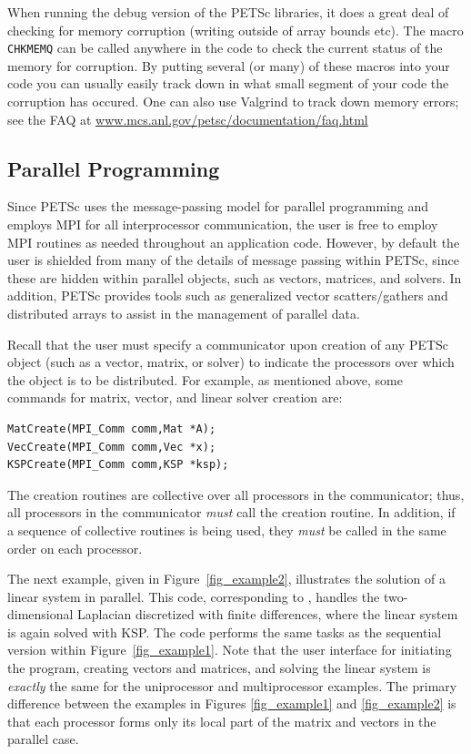 When running the debug version of the PETSc libraries, it
does a great deal of checking for memory corruption (writing outside of
array bounds etc). The macro \lstinline{CHKMEMQ} can be called
anywhere in the code to check the current status of the memory for corruption.
By putting several (or many) of these macros into your code you can usually
easily track down in what small segment of your code the corruption has occured.
One can also use Valgrind to track down memory errors; see the FAQ at
\href{http://www.mcs.anl.gov/petsc/documentation/faq.html}{www.mcs.anl.gov/petsc/documentation/faq.html}

\subsection*{Parallel Programming}
Since PETSc uses the message-passing model for
parallel programming and employs MPI for all interprocessor
communication, the user is free to employ MPI routines as needed
throughout an application code.  However, by default the user is
shielded from many of the details of message passing within PETSc,
since these are hidden within parallel objects, such as vectors,
matrices, and solvers.  In addition, PETSc provides tools such as
generalized vector scatters/gathers and distributed arrays to assist
in the management of parallel data.

Recall that the user must specify a communicator upon creation of any
PETSc object (such as a vector, matrix, or solver) to indicate the
processors over which the object is to be distributed.  For example,
as mentioned above, some commands for matrix, vector, and linear solver
creation are:
\begin{lstlisting}
MatCreate(MPI_Comm comm,Mat *A);
VecCreate(MPI_Comm comm,Vec *x);
KSPCreate(MPI_Comm comm,KSP *ksp);
\end{lstlisting}
The creation routines are collective over all processors in the
communicator; thus, all processors in the communicator {\em must}
call the creation routine.  In addition, if a sequence of
collective routines is being used, they {\em must} be called
in the same order on each processor.

The next example, given in Figure~\ref{fig_example2}, illustrates the
solution of a linear system in parallel.  This code, corresponding to
\href{http://www.mcs.anl.gov/petsc/petsc-current/src/ksp/ksp/examples/tutorials/ex3.c.html}{}, handles the
two-dimensional Laplacian discretized with finite differences, where
the linear system is again solved with KSP.  The code performs the
same tasks as the sequential version within Figure~\ref{fig_example1}.
Note that the user interface for initiating the program, creating
vectors and matrices, and solving the linear system is {\em exactly}
the same for the uniprocessor and multiprocessor examples.  The
primary difference between the examples in Figures \ref{fig_example1}
and \ref{fig_example2} is that each processor forms only its local
part of the matrix and vectors in the parallel case.

